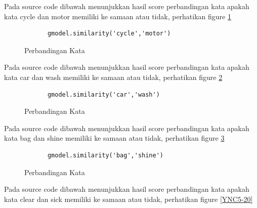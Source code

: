 \begin{enumerate}
	\subitem Pada source code dibawah menunjukkan hasil score perbandingan kata apakah kata cycle dan motor memiliki ke samaan atau tidak, perhatikan figure \ref{YNC5-17}

		\begin{verbatim}
			gmodel.similarity('cycle','motor')
		\end{verbatim}

		\begin{figure}[ht]
			\caption{Perbandingan Kata}
			\label{YNC5-17}
		\end{figure}

Pada source code dibawah menunjukkan hasil score perbandingan kata apakah kata car dan wash memiliki ke samaan atau tidak, perhatikan figure \ref{YNC5-18}

		\begin{verbatim}
			gmodel.similarity('car','wash')
		\end{verbatim}

		\begin{figure}[ht]
			\caption{Perbandingan Kata}
			\label{YNC5-18}
		\end{figure}

Pada source code dibawah menunjukkan hasil score perbandingan kata apakah kata bag dan shine memiliki ke samaan atau tidak, perhatikan figure \ref{YNC5-19}

		\begin{verbatim}
			gmodel.similarity('bag','shine')
		\end{verbatim}

		\begin{figure}[ht]
			\caption{Perbandingan Kata}
			\label{YNC5-19}
		\end{figure}

Pada source code dibawah menunjukkan hasil score perbandingan kata apakah kata clear dan sick memiliki ke samaan atau tidak, perhatikan figure \ref{YNC5-20}


\end{enumerate}
